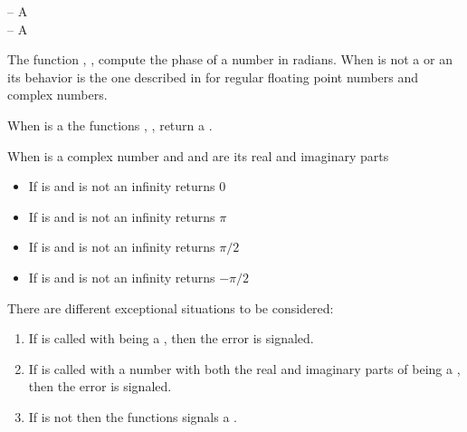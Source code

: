 \documentclass[../Exponentials-Logarithms-Trigonometry.tex]{subfiles}
\begin{document}

\DSyntax{}

  \RArrow {}

\DArgsNValues{}

 -- A \\
 -- A 

\DDescription{}

The function , ,  compute the phase of a 
number in radians. When  is not a  or an
 its behavior is the one described in
\cite{1996:ANSIHyperSpec} for regular floating point numbers and complex
numbers.

\noindent
When  is a  the functions ,
,  return a .

When  is a complex number and  and  are its
real and imaginary parts
\begin{itemize}
\item If  is  and  is not an
  infinity  returns $0$
\item If  is  and  is not an
  infinity  returns $\pi$
\item If  is  and  is not an
  infinity  returns $\pi/2$
\item If  is  and  is not an
  infinity  returns $-\pi/2$
\end{itemize}

\DExceptional{}

There are different exceptional situations to be considered:
\begin{enumerate}
\item If  is called with
   being a , then the
   error is signaled.
\item If  is called with a number with both the real and
  imaginary parts of  being a , then the
   error is signaled.
\item If  is not \CL{}
   then the functions  signals a
  .
\end{enumerate}
\end{document}
